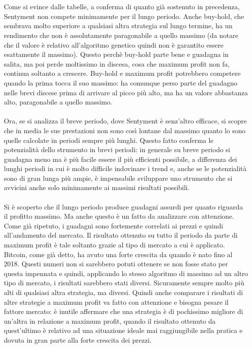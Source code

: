 \documentclass[a4paper,12pt]{report}
\begin{document}
\begin{fig}
\\~\\ Come si evince dalle tabelle, a conferma di quanto già sostenuto in precedenza, Sentyment non compete minimamente per il lungo periodo. Anche buy-hold, che sembrava molto superiore a qualsiasi altra strategia sul lungo termine, ha un rendimento che non è assolutamente paragonabile a quello massimo (da notare che il valore è relativo all'algoritmo genetico quindi non è garantito essere esattamente il massimo). Questo perchè buy-hold parte bene e guadagna in salita, ma poi perde moltissimo in discesa, cosa che maximum profit non fa, continua soltanto a crescere. Buy-hold e maximum profit potrebbero competere quando la prima tocca il suo massimo: ha comunque perso parte del guadagno nelle brevi discese prima di arrivare al picco più alto, ma ha un valore abbastanza alto, paragonabile a quello massimo. %
\\~\\ Ora, se si analizza il breve periodo, dove Sentyment è senz'altro efficace, si scopre che in media le sue prestazioni non sono così lontane dal massimo quanto lo sono quelle calcolate in periodi sempre più lunghi. Questo fatto conferma le potenzialità dello strumento in brevi periodi: in generale su breve periodo si guadagna meno ma è più facile essere il più efficienti possibile, a differenza dei lunghi periodi in cui è molto difficile indovinare i trend e, anche se le potenzialità sono di gran lunga più ampie, è impensabile sviluppare uno strumento che si avvicini anche solo minimamente ai massimi risultati possibili.\\~\\
Si è scoperto che il lungo periodo produce guadagni assurdi per quanto riguarda il profitto massimo. Ma anche questo è un fatto da analizzare con attenzione. Come già ripetuto, i guadagni sono fortemente correlati ai prezzi e quindi all'andamento del mercato. Il risultato ottenuto su tutto il periodo da parte di maximum profit è tale soltanto grazie al tipo di mercato a cui è applicato. Bitcoin, come già detto, ha avuto una forte crescita da quando è nato fino al 2018. Questi numeri non si sarebbero potuti ottenere se non fosse stato per questa impennata e quindi, applicando lo stesso algoritmo di massimo ad un altro tipo di mercato, i risultati sarebbero stati diversi. Sicuramente sempre molto più alti di qualsiasi altra strategia, ma diversi. Quindi anche comparare i risultati di altre strategie a maximum profit va fatto con attenzione e bisogna pesare il fattore mercato: è inutile affermare che una strategia è di pochissimo migliore di un'altra in relazione a maximum profit, quando il risultato ottenuto da quest'ultimo è relativo ad una situazione ideale mai raggiungibile nella pratica e dovuta in gran parte alla forte crescita dei prezzi.


\end{fig}
\end{document}

